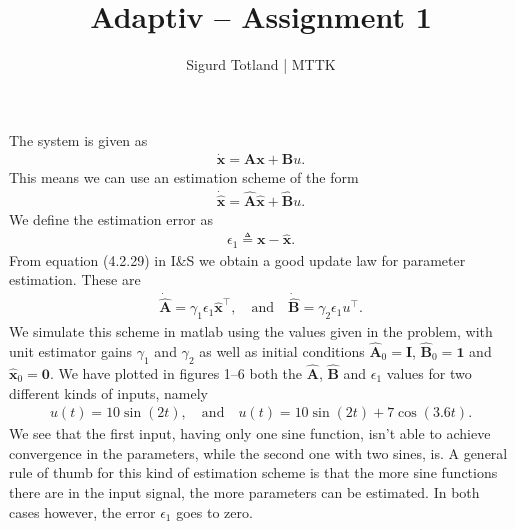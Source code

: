 \documentclass[]{article}
\title{Adaptiv – Assignment 1}
\author{Sigurd Totland | MTTK}
\begin{document}
\maketitle

\section{}
The system is given as
\begin{equation}\begin{aligned}
\mathbf{\dot x} = \mathbf{Ax} + \mathbf{B}u.
\end{aligned}\end{equation}
This means we can use an estimation scheme of the form
\begin{equation}\begin{aligned}
\mathbf{\dot {\hat x}} = \mathbf{\hat A \hat x} + \mathbf{\hat B} u.
\end{aligned}\end{equation}
We define the estimation error as
\begin{equation}\begin{aligned}
\epsilon_1 \triangleq \mathbf{x} - \mathbf{\hat x}.
\end{aligned}\end{equation}
From equation (4.2.29) in I\&S we obtain a good update law for parameter estimation. These are
\begin{equation}\begin{aligned}
\mathbf{\dot {\hat A}} = \gamma_1 \epsilon_1 \mathbf{\hat x}^\top,
\quad \text{and} \quad
\mathbf{\dot {\hat B}} = \gamma_2 \epsilon_1 u^\top.
\end{aligned}\end{equation}
We simulate this scheme in matlab using the values given in the problem, with unit estimator gains $\gamma_1$ and $\gamma_2$ as well as initial conditions $\mathbf{\hat A}_0 = \mathbf{I}$, $\mathbf{\hat B}_0 = \mathbf{1}$ and $\mathbf{\hat x}_0=\mathbf{0}$. We have plotted in figures 1–6 both the $\mathbf{\hat A}$, $\mathbf{\hat B}$ and $\epsilon_1$ values for two different kinds of inputs, namely
\begin{equation}\begin{aligned}
u(t) = 10\sin(2t),
\quad \text{and} \quad
u(t) = 10\sin(2t) + 7\cos(3.6t).
\end{aligned}\end{equation}
We see that the first input, having only one sine function, isn't able to achieve convergence in the parameters, while the second one with two sines, is. A general rule of thumb for this kind of estimation scheme is that the more sine functions there are in the input signal, the more parameters can be estimated. In both cases however, the error $\epsilon_1$ goes to zero.
\end{document}
